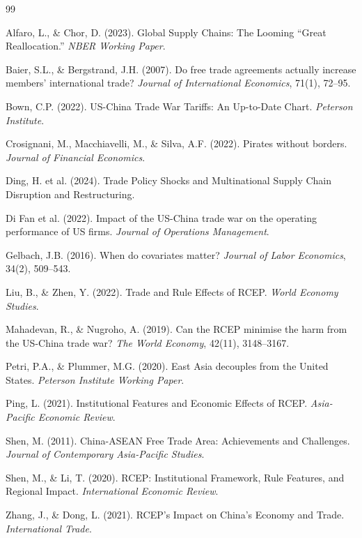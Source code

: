 \documentclass[preprint,12pt,authoryear]{elsarticle}
\begin{document}
\begin{thebibliography}{99}

Alfaro, L., \& Chor, D. (2023). Global Supply Chains: The Looming ``Great Reallocation.'' \textit{NBER Working Paper}.

Baier, S.L., \& Bergstrand, J.H. (2007). Do free trade agreements actually increase members' international trade? \textit{Journal of International Economics}, 71(1), 72--95.

Bown, C.P. (2022). US-China Trade War Tariffs: An Up-to-Date Chart. \textit{Peterson Institute}.

Crosignani, M., Macchiavelli, M., \& Silva, A.F. (2022). Pirates without borders. \textit{Journal of Financial Economics}.

Ding, H. et al. (2024). Trade Policy Shocks and Multinational Supply Chain Disruption and Restructuring.

Di Fan et al. (2022). Impact of the US-China trade war on the operating performance of US firms. \textit{Journal of Operations Management}.

Gelbach, J.B. (2016). When do covariates matter? \textit{Journal of Labor Economics}, 34(2), 509--543.

Liu, B., \& Zhen, Y. (2022). Trade and Rule Effects of RCEP. \textit{World Economy Studies}.

Mahadevan, R., \& Nugroho, A. (2019). Can the RCEP minimise the harm from the US-China trade war? \textit{The World Economy}, 42(11), 3148--3167.

Petri, P.A., \& Plummer, M.G. (2020). East Asia decouples from the United States. \textit{Peterson Institute Working Paper}.

Ping, L. (2021). Institutional Features and Economic Effects of RCEP. \textit{Asia-Pacific Economic Review}.

Shen, M. (2011). China-ASEAN Free Trade Area: Achievements and Challenges. \textit{Journal of Contemporary Asia-Pacific Studies}.

Shen, M., \& Li, T. (2020). RCEP: Institutional Framework, Rule Features, and Regional Impact. \textit{International Economic Review}.

Zhang, J., \& Dong, L. (2021). RCEP's Impact on China's Economy and Trade. \textit{International Trade}.

\end{thebibliography}
\end{document}
